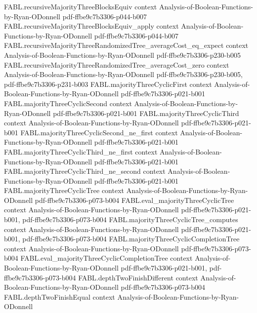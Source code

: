 \begin{theorem}
\proofstep
  {FABL.recursiveMajorityThreeBlocksEquiv}
  {context}
  {Analysis-of-Boolean-Functions-by-Ryan-ODonnell}
  {pdf-ffbe9c7b3306-p044-b007}
\proofstep
  {FABL.recursiveMajorityThreeBlocksEquiv_apply}
  {context}
  {Analysis-of-Boolean-Functions-by-Ryan-ODonnell}
  {pdf-ffbe9c7b3306-p044-b007}
\proofstep
  {FABL.recursiveMajorityThreeRandomizedTree_averageCost_eq_expect}
  {context}
  {Analysis-of-Boolean-Functions-by-Ryan-ODonnell}
  {pdf-ffbe9c7b3306-p230-b005}
\proofstep
  {FABL.recursiveMajorityThreeRandomizedTree_averageCost_zero}
  {context}
  {Analysis-of-Boolean-Functions-by-Ryan-ODonnell}
  {pdf-ffbe9c7b3306-p230-b005,
    pdf-ffbe9c7b3306-p231-b003}
\proofstep
  {FABL.majorityThreeCyclicFirst}
  {context}
  {Analysis-of-Boolean-Functions-by-Ryan-ODonnell}
  {pdf-ffbe9c7b3306-p021-b001}
\proofstep
  {FABL.majorityThreeCyclicSecond}
  {context}
  {Analysis-of-Boolean-Functions-by-Ryan-ODonnell}
  {pdf-ffbe9c7b3306-p021-b001}
\proofstep
  {FABL.majorityThreeCyclicThird}
  {context}
  {Analysis-of-Boolean-Functions-by-Ryan-ODonnell}
  {pdf-ffbe9c7b3306-p021-b001}
\proofstep
  {FABL.majorityThreeCyclicSecond_ne_first}
  {context}
  {Analysis-of-Boolean-Functions-by-Ryan-ODonnell}
  {pdf-ffbe9c7b3306-p021-b001}
\proofstep
  {FABL.majorityThreeCyclicThird_ne_first}
  {context}
  {Analysis-of-Boolean-Functions-by-Ryan-ODonnell}
  {pdf-ffbe9c7b3306-p021-b001}
\proofstep
  {FABL.majorityThreeCyclicThird_ne_second}
  {context}
  {Analysis-of-Boolean-Functions-by-Ryan-ODonnell}
  {pdf-ffbe9c7b3306-p021-b001}
\proofstep
  {FABL.majorityThreeCyclicTree}
  {context}
  {Analysis-of-Boolean-Functions-by-Ryan-ODonnell}
  {pdf-ffbe9c7b3306-p073-b004}
\proofstep
  {FABL.eval_majorityThreeCyclicTree}
  {context}
  {Analysis-of-Boolean-Functions-by-Ryan-ODonnell}
  {pdf-ffbe9c7b3306-p021-b001,
    pdf-ffbe9c7b3306-p073-b004}
\proofstep
  {FABL.majorityThreeCyclicTree_computes}
  {context}
  {Analysis-of-Boolean-Functions-by-Ryan-ODonnell}
  {pdf-ffbe9c7b3306-p021-b001,
    pdf-ffbe9c7b3306-p073-b004}
\proofstep
  {FABL.majorityThreeCyclicCompletionTree}
  {context}
  {Analysis-of-Boolean-Functions-by-Ryan-ODonnell}
  {pdf-ffbe9c7b3306-p073-b004}
\proofstep
  {FABL.eval_majorityThreeCyclicCompletionTree}
  {context}
  {Analysis-of-Boolean-Functions-by-Ryan-ODonnell}
  {pdf-ffbe9c7b3306-p021-b001,
    pdf-ffbe9c7b3306-p073-b004}
\proofstep
  {FABL.depthTwoFinishDifferent}
  {context}
  {Analysis-of-Boolean-Functions-by-Ryan-ODonnell}
  {pdf-ffbe9c7b3306-p073-b004}
\proofstep
  {FABL.depthTwoFinishEqual}
  {context}
  {Analysis-of-Boolean-Functions-by-Ryan-ODonnell}

\end{theorem}
